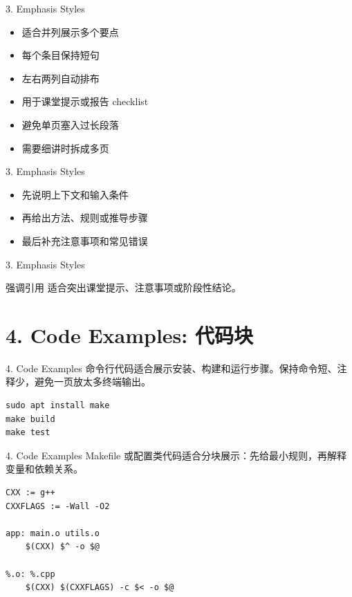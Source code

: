 \documentclass[aspectratio=169,10pt]{beamer}
\begin{document}
\begin{frame}[fragile]{3. Emphasis Styles}
\begin{itemize}
\item
  适合并列展示多个要点
\item
  每个条目保持短句
\item
  左右两列自动排布
\item
  用于课堂提示或报告 checklist
\item
  避免单页塞入过长段落
\item
  需要细讲时拆成多页
\end{itemize}
\end{frame}

\begin{frame}[fragile]{3. Emphasis Styles}
\begin{itemize}
\item
  先说明上下文和输入条件
\item
  再给出方法、规则或推导步骤
\item
  最后补充注意事项和常见错误
\end{itemize}
\end{frame}

\begin{frame}[t,fragile]{3. Emphasis Styles}
\begin{vspquote}{强调引用}
适合突出课堂提示、注意事项或阶段性结论。
\end{vspquote}
\end{frame}

\section{4. Code Examples: 代码块}

\begin{frame}[fragile]{4. Code Examples}
命令行代码适合展示安装、构建和运行步骤。保持命令短、注释少，避免一页放太多终端输出。

\begin{lstlisting}
sudo apt install make
make build
make test
\end{lstlisting}
\end{frame}

\begin{frame}[fragile]{4. Code Examples}
Makefile 或配置类代码适合分块展示：先给最小规则，再解释变量和依赖关系。

\begin{lstlisting}
CXX := g++
CXXFLAGS := -Wall -O2

app: main.o utils.o
    $(CXX) $^ -o $@

%.o: %.cpp
    $(CXX) $(CXXFLAGS) -c $< -o $@
\end{lstlisting}
\end{frame}

\end{document}
